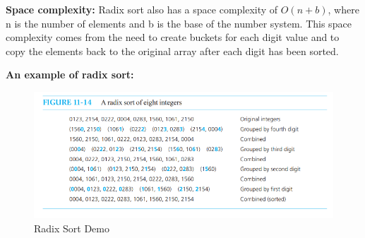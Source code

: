 \textbf{Space complexity: }
Radix sort also has a space complexity of $O(n + b)$, where n is the number of elements and b is the base of the number system. This space complexity comes from the need to create buckets for each digit value and to copy the elements back to the original array after each digit has been sorted.

\textbf{An example of radix sort:} ~\cite{ref2}

\begin{figure}[h]
    \centering
    \includegraphics[width=1.\textwidth]{Figures/sort_demo/radix.png}
    \caption{Radix Sort Demo}
    \label{fig:enter-label}
\end{figure}